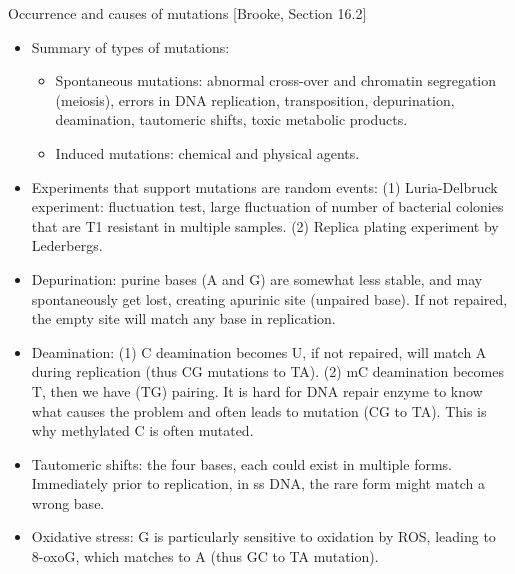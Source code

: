 \documentclass{report}
\begin{document}
Occurrence and causes of mutations [Brooke, Section 16.2]
\begin{itemize}
	\item Summary of types of mutations: 
	\begin{itemize}
		\item Spontaneous mutations: abnormal cross-over and chromatin segregation (meiosis), errors in DNA replication, transposition, depurination, deamination, tautomeric shifts, toxic metabolic products.  
		\item Induced mutations: chemical and physical agents. 
	\end{itemize}
	
	\item Experiments that support mutations are random events: (1) Luria-Delbruck experiment: fluctuation test, large fluctuation of number of bacterial colonies that are T1 resistant in multiple samples. (2) Replica plating experiment by Lederbergs. 
	
	\item Depurination: purine bases (A and G) are somewhat less stable, and may spontaneously get lost, creating apurinic site (unpaired base). If not repaired, the empty site will match any base in replication.  
	
	\item Deamination: (1) C deamination becomes U, if not repaired, will match A during replication (thus CG mutations to TA). (2) mC deamination becomes T, then we have (TG) pairing. It is hard for DNA repair enzyme to know what causes the problem and often leads to mutation (CG to TA). This is why methylated C is often mutated.  
	
	\item Tautomeric shifts: the four bases, each could exist in multiple forms. Immediately prior to replication, in ss DNA, the rare form might match a wrong base. 
	
	\item Oxidative stress: G is particularly sensitive to oxidation by ROS, leading to 8-oxoG, which matches to A (thus GC to TA mutation). 
\end{itemize}
\end{document}
